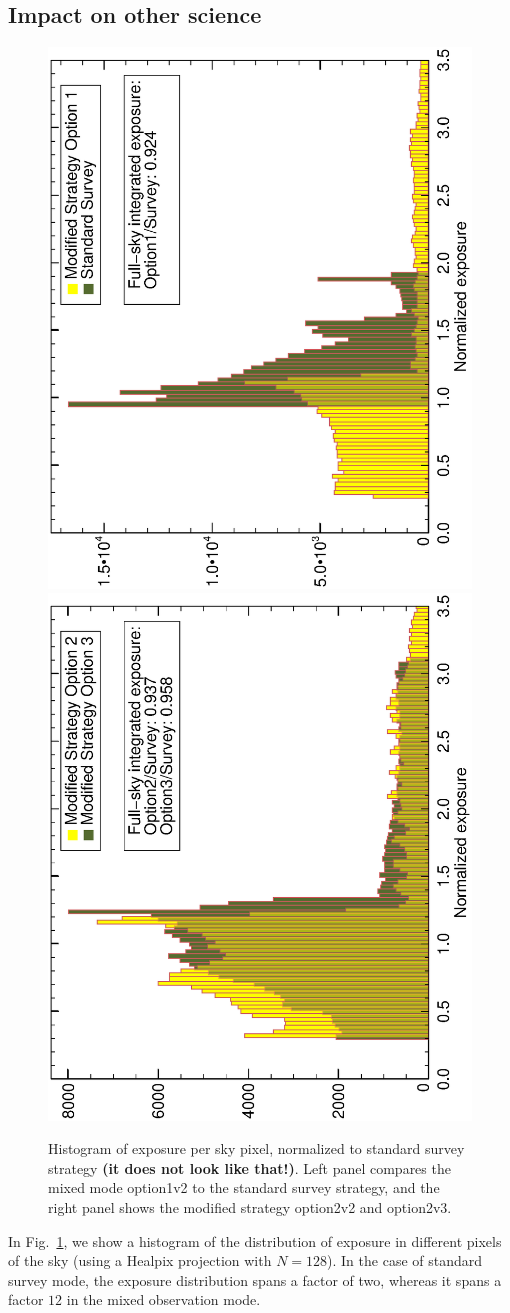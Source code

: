 \documentclass[aps,prd,superscriptaddress,showpacs,nofootinbib,fixlfloat, 12pt]{revtex4-1}
\begin{document}
\subsection{Impact on other science}

\begin{figure}[t]
  \begin{center}
    \includegraphics[width=0.39\linewidth, angle=-90]{plots/option1_survey_hist.ps}
    \includegraphics[width=0.39\linewidth, angle=-90]{plots/option2_option3_hist.ps}
    \vspace{-0.5cm}
  \end{center}
  \caption{Histogram of exposure per sky pixel, normalized to standard survey
    strategy \textbf{(it does not look like that!)}. Left panel compares the
    mixed mode option1v2 to the standard survey strategy, and the right panel
    shows the modified strategy option2v2 and option2v3.}
  \label{fig:expHisto}
\end{figure}

In Fig.~\ref{fig:expHisto}, we show a histogram of the distribution of exposure
in different pixels of the sky (using a Healpix projection with $N=128$). In
the 
case of standard survey mode, the exposure distribution spans a factor of two,
whereas it spans a factor $12$ in the mixed observation mode. 
\end{document}
